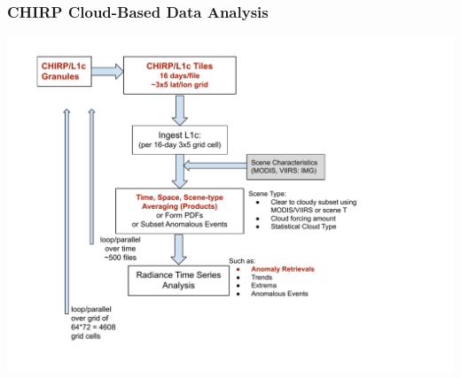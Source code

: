 \documentclass[10pt,t]{beamer}
\begin{document}
\begin{frame}
  \frametitle{CHIRP Cloud-Based Data Analysis}
  \vspace{-0.1in}
  \includegraphics[width=0.85\linewidth]{./chirp_flow.pdf}
\end{frame}
\end{document}
